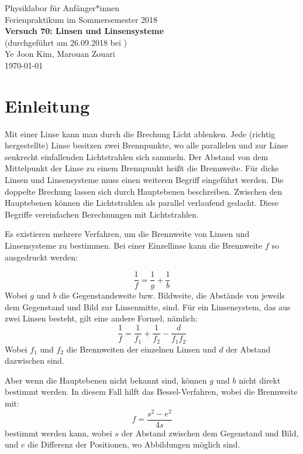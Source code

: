 \documentclass[11pt,a4paper]{article}
\begin{document}
	

{
	\centering 
	\large 
	Physiklabor für Anfänger*innen \\
	Ferienpraktikum im Sommersemester 2018 \\[4mm]
	\textbf{\LARGE 
		Versuch 70: Linsen und Linsensysteme
	} \\[3mm]
	(durchgeführt am 26.09.2018 bei ) \\
	Ye Joon Kim, Marouan Zouari\\
	\today \\[10mm]
}
\tableofcontents

\section{Einleitung}
Mit einer Linse kann man durch die Brechung Licht ablenken. Jede (richtig hergestellte) Linse besitzen zwei Brennpunkte, wo alle parallelen und zur Linse senkrecht einfallenden Lichtstrahlen sich sammeln. Der Abstand von dem Mittelpunkt der Linse zu einem Brennpunkt heißt die Brennweite. Für dicke Linsen und Linsensysteme muss einen weiteren Begriff eingeführt werden. Die doppelte Brechung lassen sich durch Hauptebenen beschreiben. Zwischen den Hauptebenen können die Lichtstrahlen als parallel verlaufend gedacht. Diese Begriffe vereinfachen Berechnungen mit Lichtstrahlen. 

Es existieren mehrere Verfahren, um die Brennweite von Linsen und Linsensysteme zu bestimmen. Bei einer Einzellinse kann die Brennweite $f$ so ausgedruckt werden: 

\begin{equation}
\frac{1}{f} = \frac{1}{g} + \frac{1}{b}
\end{equation}
Wobei $g$ und $b$ die Gegenstandsweite bzw. Bildweite, die Abstände von jeweils dem Gegenstand und Bild zur Linsenmitte, sind.
Für ein Linsensystem, das aus zwei Linsen besteht, gilt eine andere Formel, nämlich:
\begin{equation}
\frac{1}{f} = \frac{1}{f_1}+\frac{1}{f_2}-\frac{d}{f_1f_2}
\end{equation}
Wobei $f_1$ und $f_2$ die Brennweiten der einzelnen Linsen und $d$ der Abstand dazwischen sind. 

Aber wenn die Hauptebenen nicht bekannt sind, können $g$ und $b$ nicht direkt bestimmt werden. In diesem Fall hilft das Bessel-Verfahren, wobei die Brennweite mit:
\begin{equation}
f = \frac{s^2-e^2}{4s}
\end{equation}
bestimmt werden kann, wobei $s$ der Abstand zwischen dem Gegenstand und Bild, und $e$ die Differenz der Positionen, wo Abbildungen möglich sind. 
\end{document}
